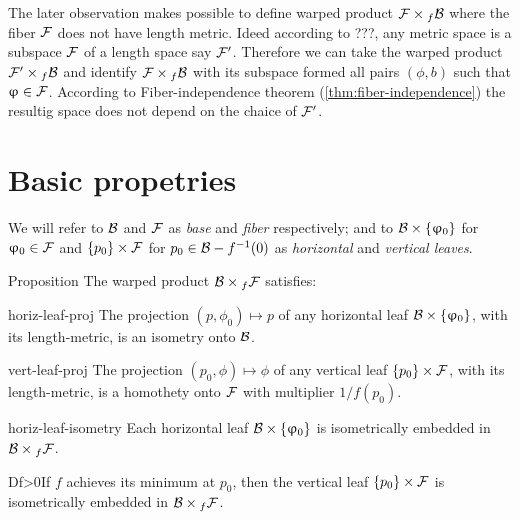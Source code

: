 The later observation makes possible to define warped product $\spc{F}\times_f \spc{B}$ where the fiber $\mathcal{F}$ does not have length metric.
Ideed according to ???, any metric space is a subspace $\mathcal{F}$ of a length space say $\mathcal{F}'$.
Therefore we can take the warped product $\spc{F}'\times_f \spc{B}$
and identify $\spc{F}\times_f \spc{B}$ with its subspace formed all pairs $(\phi,b)$ such that $\phi\in \spc{F}$.
According to Fiber-independence theorem (\ref{thm:fiber-independence}) the resultig space does not depend on the chaice of $\mathcal{F}'$.





\section{Basic propetries}

We will refer to $\mathcal{B}$ and $\mathcal{F}$ as \emph{base} and \emph{fiber} respectively; 
and to $\spc{B}\times\{\phi_0\}$ for $\phi_0\in  \spc{F}$ and $\{p_0\}\times \spc{F}$ for $p_0\in \spc{B}-f^{-1}(0)$ as \emph{horizontal} and \emph{vertical leaves}.

\begin{thm}{Proposition}
The warped product $\spc{\spc{B}}\times_f\spc{F}$ satisfies:

\begin{subthm}{horiz-leaf-proj}
The projection $(p,\phi_0)\mapsto p$  of any  horizontal leaf $\spc{B}\times\{\phi_0\}$, with its length-metric,  is an isometry onto $\mathcal{B}$.
\end{subthm}

\begin{subthm}{vert-leaf-proj}
The projection $(p_0,\phi)\mapsto \phi$ of any  vertical leaf $\{p_0\}\times \spc{F}$, with its length-metric,  is a homothety onto $\mathcal{F}$ with multiplier $1/f(p_0)$.
\end{subthm}


\begin{subthm}{horiz-leaf-isometry}
Each horizontal leaf $\spc{B}\times\{\phi_0\}$ is isometrically embedded in $\spc{B}\times_f\spc{F}$.
\end{subthm}


\begin{subthm}{Df>0}If  $f$ achieves its minimum at $p_0$, then the vertical leaf $\{p_0\} \times \spc{F}$ is isometrically embedded in $\spc{B}\times_f\spc{F}$.
\end{subthm}

\end{thm}


